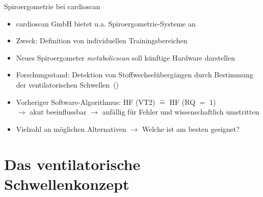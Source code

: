 \documentclass[colorBG,slideColor,8pt]{beamer}
\begin{document}
\begin{frame}{Spiroergometrie bei cardioscan}
\begin{itemize}
	\item cardioscan GmbH bietet u.a. Spiroergometrie-Systeme an
	\item Zweck: Definition von individuellen Trainingsbereichen
	\item Neues Spiroergometer \textsl{metabolicscan} soll künftige Hardware darstellen
	\item Forschungsstand: Detektion von Stoffwechselübergängen durch Bestimmung der ventilatorischen Schwellen~(\cite{Westhoff.2012})
	\item Vorheriger Software-Algorithmus: HF (VT2) $\hat{=}$  HF (RQ $=$ 1)\\$\rightarrow$ akut beeinflussbar $\rightarrow$ anfällig für Fehler und wissenschaftlich umstritten
	\item Vielzahl an möglichen Alternativen $\rightarrow$ Welche ist am besten geeignet?
\end{itemize}
\end{frame}


\section{Das ventilatorische Schwellenkonzept}
\end{document}
